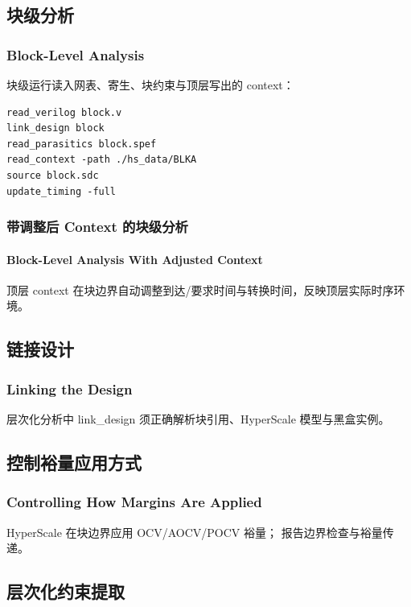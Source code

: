 \subsection{块级分析}
\subsubsection*{Block-Level Analysis}

块级运行读入网表、寄生、块约束与顶层写出的 context：
\begin{lstlisting}
read_verilog block.v
link_design block
read_parasitics block.spef
read_context -path ./hs_data/BLKA
source block.sdc
update_timing -full
\end{lstlisting}

\subsubsection{带调整后 Context 的块级分析}
\paragraph*{Block-Level Analysis With Adjusted Context}

顶层 context 在块边界自动调整到达/要求时间与转换时间，反映顶层实际时序环境。

\subsection{链接设计}
\subsubsection*{Linking the Design}

层次化分析中 link_design 须正确解析块引用、HyperScale 模型与黑盒实例。

\subsection{控制裕量应用方式}
\subsubsection*{Controlling How Margins Are Applied}

HyperScale 在块边界应用 OCV/AOCV/POCV 裕量； 报告边界检查与裕量传递。

\subsection{层次化约束提取}
